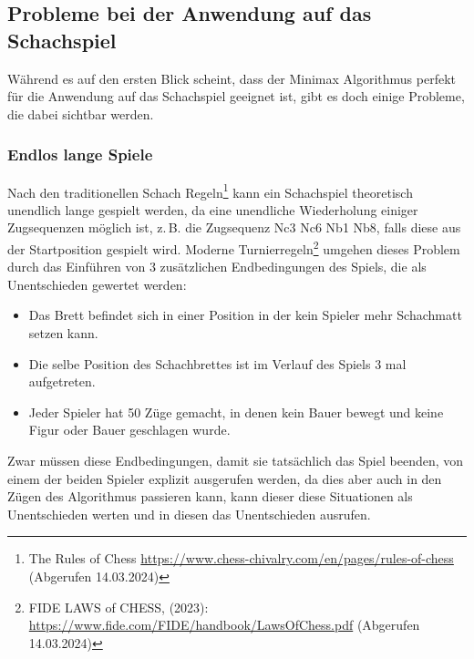 \documentclass[12pt, a4paper, oneside, openright]{article}
\newcommand \zB{z.\,B.\xspace }
\begin{document}
\subsection{Probleme bei der Anwendung auf das Schachspiel}\label{subsec:probleme-bei-der-anwendung-auf-das-schachspiel}
Während es auf den ersten Blick scheint, dass der Minimax Algorithmus perfekt für die Anwendung auf das Schachspiel geeignet ist, gibt es doch einige Probleme, die dabei sichtbar werden.

\subsubsection{Endlos lange Spiele}
Nach den traditionellen Schach Regeln\footnote{The Rules of Chess \url{https://www.chess-chivalry.com/en/pages/rules-of-chess} (Abgerufen 14.03.2024)} kann ein Schachspiel theoretisch unendlich lange gespielt werden, da eine unendliche Wiederholung einiger Zugsequenzen möglich ist, \zB die Zugsequenz {\selectfont Nc3 Nc6 Nb1 Nb8}, falls diese aus der Startposition gespielt wird.
Moderne Turnierregeln\footnote{FIDE LAWS of CHESS, (2023): \url{https://www.fide.com/FIDE/handbook/LawsOfChess.pdf} (Abgerufen 14.03.2024)} umgehen dieses Problem durch das Einführen von 3 zusätzlichen Endbedingungen des Spiels, die als Unentschieden gewertet werden:
\begin{itemize}
    \item Das Brett befindet sich in einer Position in der kein Spieler mehr Schachmatt setzen kann.
    \item Die selbe Position des Schachbrettes ist im Verlauf des Spiels 3 mal aufgetreten.
    \item Jeder Spieler hat 50 Züge gemacht, in denen kein Bauer bewegt und keine Figur oder Bauer geschlagen wurde.
\end{itemize}
Zwar müssen diese Endbedingungen, damit sie tatsächlich das Spiel beenden, von einem der beiden Spieler explizit ausgerufen werden, da dies aber auch in den Zügen des Algorithmus passieren kann, kann dieser diese Situationen als Unentschieden werten und in diesen das Unentschieden ausrufen.
\end{document}

